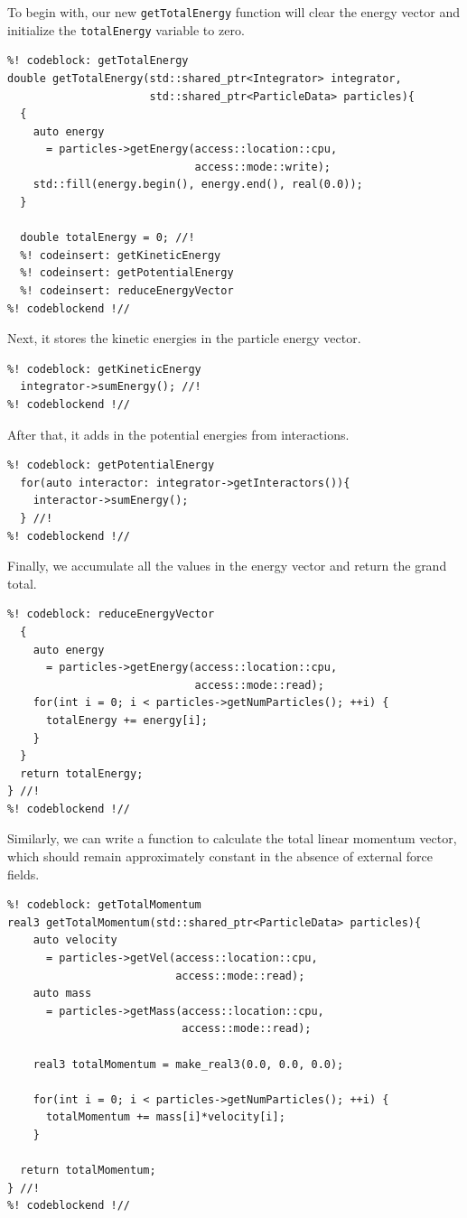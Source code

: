 To begin with, our new \texttt{getTotalEnergy} function will clear the energy 
vector and initialize the \texttt{totalEnergy} variable to zero.
\begin{lstlisting}
%! codeblock: getTotalEnergy
double getTotalEnergy(std::shared_ptr<Integrator> integrator,
                      std::shared_ptr<ParticleData> particles){
  {
    auto energy
      = particles->getEnergy(access::location::cpu,
                             access::mode::write);
    std::fill(energy.begin(), energy.end(), real(0.0));
  }

  double totalEnergy = 0; //!
  %! codeinsert: getKineticEnergy
  %! codeinsert: getPotentialEnergy
  %! codeinsert: reduceEnergyVector
%! codeblockend !//
\end{lstlisting}
Next, it stores the kinetic energies in the particle energy vector.
\begin{lstlisting}
%! codeblock: getKineticEnergy
  integrator->sumEnergy(); //!
%! codeblockend !//
\end{lstlisting}
After that, it adds in the potential energies from interactions.
\begin{lstlisting}
%! codeblock: getPotentialEnergy
  for(auto interactor: integrator->getInteractors()){
    interactor->sumEnergy();
  } //!
%! codeblockend !//
\end{lstlisting}
Finally, we accumulate all the values in the energy vector and return the grand 
total.
\begin{lstlisting}
%! codeblock: reduceEnergyVector
  {
    auto energy
      = particles->getEnergy(access::location::cpu,
                             access::mode::read);
    for(int i = 0; i < particles->getNumParticles(); ++i) {
      totalEnergy += energy[i];
    }
  }
  return totalEnergy;
} //!
%! codeblockend !//
\end{lstlisting}

Similarly, we can write a function to calculate the total linear momentum 
vector, which should remain approximately constant in the absence of external 
force fields.

\begin{lstlisting}
%! codeblock: getTotalMomentum
real3 getTotalMomentum(std::shared_ptr<ParticleData> particles){
    auto velocity
      = particles->getVel(access::location::cpu,
                          access::mode::read);
    auto mass
      = particles->getMass(access::location::cpu,
                           access::mode::read);

    real3 totalMomentum = make_real3(0.0, 0.0, 0.0);

    for(int i = 0; i < particles->getNumParticles(); ++i) {
      totalMomentum += mass[i]*velocity[i];
    }

  return totalMomentum;
} //!
%! codeblockend !//
\end{lstlisting}

